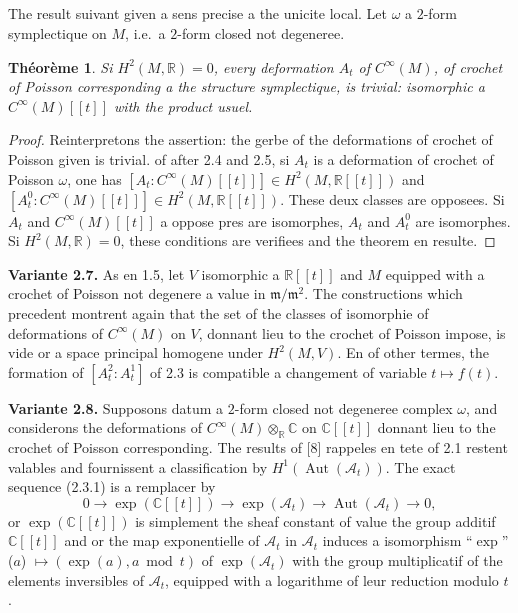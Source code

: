 \documentclass[11pt,a4paper]{article}
\theoremstyle{plain}
\newtheorem{theorem}{Th\'eor\`eme}[section]
\theoremstyle{definition}
\DeclareMathOperator{\Aut}{Aut}
\newcommand{\R}{\mathbb{R}}
\newcommand{\C}{\mathbb{C}}
\begin{document}
\subsection{}
The result suivant given a sens precise a the unicite local. Let $\omega$ a $2$-form symplectique on $M$, i.e.\ a $2$-form closed not degeneree.

\begin{theorem}
Si $H^{2}(M, \R) = 0$, every deformation $A_{t}$ of $C^{\infty}(M)$, of crochet of Poisson
corresponding a the structure symplectique, is trivial: isomorphic a $C^{\infty}(M)[[t]]$ with
the product usuel.
\end{theorem}

\begin{proof}
Reinterpretons the assertion: the gerbe of the deformations of crochet of Poisson given is
trivial. of after 2.4 and 2.5, si $A_{t}$ is a deformation of crochet of Poisson $\omega$,
one has $[A_{t} : C^{\infty}(M)[[t]]] \in H^{2}(M, \R[[t]])$ and $[A_{t}^{0} : C^{\infty}(M)[[t]]] \in H^{2}(M, \R[[t]])$. These deux classes are opposees. Si $A_{t}$ and $C^{\infty}(M)[[t]]$ a oppose pres are isomorphes, $A_{t}$ and $A_{t}^{0}$ are isomorphes. Si $H^{2}(M, \R) = 0$, these conditions are verifiees and the theorem en resulte.
\end{proof}

\noindent \textbf{Variante 2.7.} As en 1.5, let $V$ isomorphic a $\R[[t]]$ and $M$ equipped with a crochet of Poisson not degenere a value in $\mathfrak{m}/\mathfrak{m}^{2}$. The constructions which precedent montrent again that the set of the classes of isomorphie of deformations of $C^{\infty}(M)$
on $V$, donnant lieu to the crochet of Poisson impose, is vide or a space principal homogene under $H^{2}(M, V)$. En of other termes, the formation of $[A_{t}^{2} : A_{t}^{1}]$ of 2.3 is compatible a changement of variable $t \mapsto f(t)$.

\noindent \textbf{Variante 2.8.} Supposons datum a $2$-form closed not degeneree complex $\omega$,
and considerons the deformations of $C^{\infty}(M) \otimes_{\R} \C$ on $\C[[t]]$ donnant lieu to the crochet of Poisson corresponding. The results of [8] rappeles en tete of 2.1 restent valables and fournissent a classification by $H^{1}(\Aut(\mathcal{A}_{t}))$. The exact sequence (2.3.1) is a remplacer by
\begin{equation}
0 \longrightarrow \exp(\C[[t]]) \longrightarrow \exp(\mathcal{A}_{t}) \longrightarrow \Aut(\mathcal{A}_{t}) \longrightarrow 0, \tag{2.8.1}
\end{equation}
or $\exp(\C[[t]])$ is simplement the sheaf constant of value the group additif $\C[[t]]$ and or the map exponentielle of $\mathcal{A}_{t}$ in $\mathcal{A}_{t}$ induces a isomorphism ``$\exp$'' ($a$) $\mapsto (\exp(a), a \bmod t)$ of $\exp(\mathcal{A}_{t})$ with the group multiplicatif of the elements inversibles of $\mathcal{A}_{t}$, equipped with a logarithme of leur reduction modulo $t$.
\end{document}
